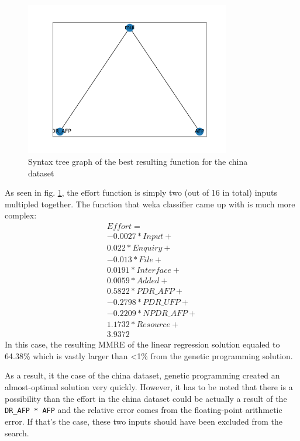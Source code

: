 \documentclass[12pt]{article}
\begin{document}
\begin{figure}[H]
  \centering
  \includegraphics[width=0.8\textwidth]{results/china/test_function}
  \caption{Syntax tree graph of the best resulting function for the china dataset}
  \label{function_china}
\end{figure}

As seen in fig. \ref{function_china}, the effort function is simply two (out of 16 in total) inputs multipled together.
The function that weka classifier came up with is much more complex:
\begin{equation}
  \begin{array}{l}
    Effort = \\
    -0.0027 * Input + \\
     0.022  * Enquiry + \\
    -0.013  * File + \\
     0.0191 * Interface + \\
     0.0059 * Added + \\
     0.5822 * PDR\_AFP + \\
    -0.2798 * PDR\_UFP + \\
    -0.2209 * NPDR\_AFP + \\
     1.1732 * Resource + \\
     3.9372
  \end{array}

\end{equation}
In this case, the resulting MMRE of the linear regression solution equaled to 64.38\% which is vastly larger than <1\% from the genetic programming solution.

As a result, it the case of the china dataset, genetic programming created an almost-optimal solution very quickly. However, it has to be noted that there is a possibility than the effort in the china dataset could be actually a result of the \texttt{DR\_AFP * AFP} and the relative error comes from the floating-point arithmetic error. If that's the case, these two inputs should have been excluded from the search.
\end{document}
